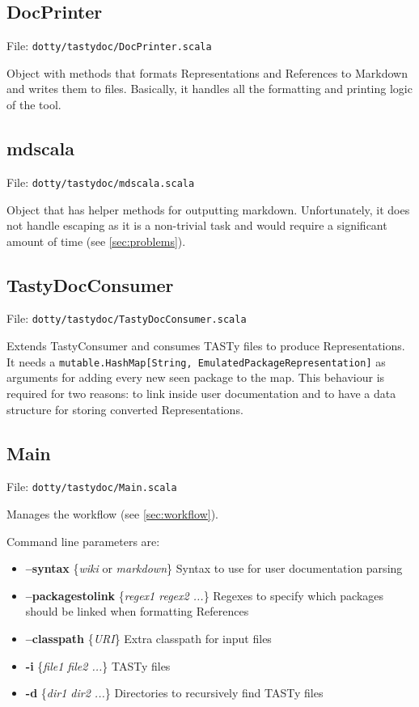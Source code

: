 \documentclass{report}
\begin{document}
\subsection{DocPrinter}
File: \texttt{dotty/tastydoc/DocPrinter.scala}

Object with methods that formats Representations and References to Markdown and writes them to files. Basically, it handles all the formatting and printing logic of the tool.

\subsection{mdscala}
File: \texttt{dotty/tastydoc/mdscala.scala}

Object that has helper methods for outputting markdown. Unfortunately, it does not handle escaping as it is a non-trivial task and would require a significant amount of time (see \autoref{sec:problems}).

\subsection{TastyDocConsumer}
File: \texttt{dotty/tastydoc/TastyDocConsumer.scala}

Extends TastyConsumer and consumes TASTy files to produce Representations. It needs a \texttt{mutable.HashMap[String, EmulatedPackageRepresentation]} as arguments for adding every new seen package to the map. This behaviour is required for two reasons: to link inside user documentation and to have a data structure for storing converted Representations.
\subsection{Main}
File: \texttt{dotty/tastydoc/Main.scala}

Manages the workflow (see \autoref{sec:workflow}).

Command line parameters are:
\begin{itemize}
    \item \textbf{--syntax} \{\textit{wiki} or \textit{markdown}\} Syntax to use for user documentation parsing
    \item \textbf{--packagestolink} \{\textit{regex1 regex2 ...}\} Regexes to specify which packages should be linked when formatting References
    \item \textbf{--classpath} \{\textit{URI}\} Extra classpath for input files
    \item \textbf{-i} \{\textit{file1 file2 ...}\} TASTy files
    \item \textbf{-d} \{\textit{dir1 dir2 ...}\} Directories to recursively find TASTy files
\end{itemize}
\end{document}
